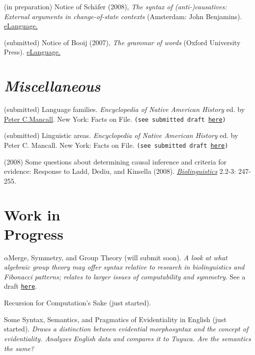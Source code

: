 \documentclass[margin,line]{resume}
\begin{document}
\begin{resume}
(in preparation) Notice of Sch\"afer (2008), \emph{The syntax of (anti-)causatives: External arguments in change-of-state contexts} (Amsterdam: John Benjamins). \href{http://www.elanguage.net/home.php}{eLanguage.}


(submitted) Notice of Booij (2007), \emph{The grammar of words} (Oxford University Press). \href{http://www.elanguage.net/home.php}{eLanguage.}


\section{{\sl Miscellaneous}}
(submitted) Language families. \emph{Encyclopedia of Native American History} ed. by \href{http://college.usc.edu/faculty/faculty1003494.html}{Peter C.Mancall}. New York: Facts on File. \texttt{(see submitted draft \href{http://sites.google.com/site/bowleslinguistics/Home/research/teaching-1/publications}{here})}

(submitted) Linguistic areas. \emph{Encyclopedia of Native American History} ed. by Peter C. Mancall. New York: Facts on File. \texttt{(see submitted draft \href{http://sites.google.com/site/bowleslinguistics/Home/research/teaching-1/publications}{here})}

(2008) Some questions about determining causal inference and criteria for evidence:
Response to Ladd, Dediu, and Kinsella (2008). \emph{\href{http://www.biolinguistics.eu.}{Biolinguistics}} 2.2-3: 247-255.

\section{Work in\\ Progress}

$\alpha$Merge, Symmetry, and Group Theory (will submit soon). \textsl{A look at what algebraic group theory may offer syntax relative to research in biolinguistics and Fibonacci patterns; relates to larger issues of computability and symmetry}. See a draft \href{http://sites.google.com/site/bowleslinguistics/Home/research}{\texttt{here}}.%

Recursion for Computation's Sake (just started). %

Some Syntax, Semantics, and Pragmatics of Evidentiality in English (just started). \textsl{Draws a distinction between evidential morphosyntax and the concept of evidentiality. Analyzes English data and compares it to Tuyuca. Are the semantics the same?} %


\end{resume}
\end{document}
